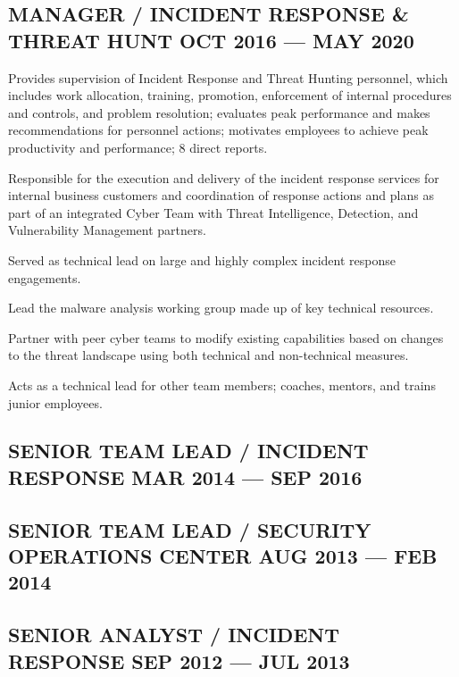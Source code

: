 \documentclass[letter,10pt]{article}
\begin{document}
\subsection{{MANAGER / INCIDENT RESPONSE \& THREAT HUNT \hfill OCT 2016 --- MAY 2020}}
\begin{zitemize}
\item Provides supervision of Incident Response and Threat Hunting personnel, which includes work allocation, training, promotion, enforcement of internal procedures and controls, and problem resolution; evaluates peak performance and makes recommendations for personnel actions; motivates employees to achieve peak productivity and performance; 8 direct reports.
\item Responsible for the execution and delivery of the incident response services for internal business
customers and coordination of response actions and plans as part of an integrated Cyber Team with Threat Intelligence, Detection, and Vulnerability Management partners.
\item Served as technical lead on large and highly complex incident response engagements.
\item Lead the malware analysis working group made up of key technical resources.
\item Partner with peer cyber teams to modify existing capabilities based on changes to the threat landscape using both technical and non-technical measures.
\item Acts as a technical lead for other team members; coaches, mentors, and trains junior employees. 
\end{zitemize}
\newpage
\subsection{{SENIOR TEAM LEAD / INCIDENT RESPONSE \hfill MAR 2014 --- SEP 2016}}
\bigskip
\subsection{{SENIOR TEAM LEAD / SECURITY OPERATIONS CENTER \hfill AUG 2013 --- FEB 2014}}
\bigskip
\subsection{{SENIOR ANALYST / INCIDENT RESPONSE \hfill SEP 2012 --- JUL 2013}}
\end{document}
